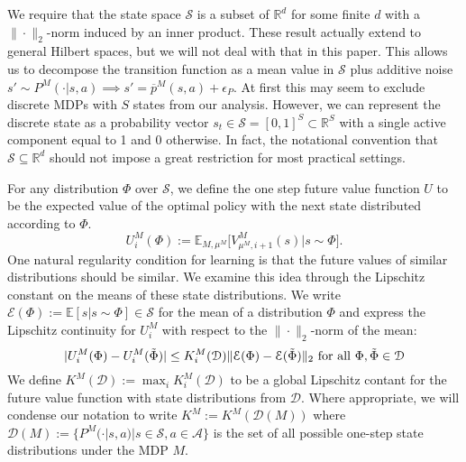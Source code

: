 \documentclass{article}
\newcommand{\Exp}{\mathds{E}}
\newcommand{\Real}{\mathds{R}}
\newcommand{\Sc}{\mathcal{S}}
\newcommand{\Ac}{\mathcal{A}}
\newcommand{\Ec}{\mathcal{E}}
\newcommand{\Dc}{\mathcal{D}}
\begin{document}
We require that the state space $\Sc$ is a subset of $\Real^d$ for some finite $d$ with a $\| \cdot \|_2$-norm induced by an inner product.
These result actually extend to general Hilbert spaces, but we will not deal with that in this paper.
This allows us to decompose the transition function as a mean value in $\Sc$ plus additive noise $s' \sim P^M(\cdot|s,a) \implies s' = \overline{p}^M(s,a) + \epsilon_P$.
At first this may seem to exclude discrete MDPs with $S$ states from our analysis.
However, we can represent the discrete state as a probability vector $s_t \in \Sc = [0,1]^S \subset \Real^S$ with a single active component equal to 1 and 0 otherwise.
In fact, the notational convention that $\Sc \subseteq \Real^d$ should not impose a great restriction for most practical settings.


For any distribution $\Phi$ over $\Sc$, we define the one step future value function $U$ to be the expected value of the optimal policy with the next state distributed according to $\Phi$.
\begin{equation}
\label{eq: future value}
U^M_{i}(\Phi) := \Exp_{M,\mu^M}\big[ V^M_{\mu^M,i+1}(s) \big| s \sim \Phi \big].
\end{equation}
One natural regularity condition for learning is that the future values of similar distributions should be similar.
We examine this idea through the Lipschitz constant on the means of these state distributions.
We write $\Ec(\Phi) := \Exp[s | s \sim \Phi] \in \Sc$ for the mean of a distribution $\Phi$ and express the Lipschitz continuity for $U_i^M$ with respect to the $\|\cdot\|_2$-norm of the mean:
\begin{equation}
\label{eq: future Lipschitz}
| U^M_i(\Phi) - U^M_i(\tilde{\Phi}) | \le K^M_i(\Dc) \| \Ec(\Phi) - \Ec(\tilde{\Phi}) \|_2 {\rm \ for \ all \ } \Phi, \tilde{\Phi} \in \Dc
\end{equation}
We define $K^M(\Dc) := \max_{i} K^M_i(\Dc)$ to be a global Lipschitz contant for the future value function with state distributions from $\Dc$.
Where appropriate, we will condense our notation to write $K^M := K^M(\mathscr{D}(M))$ where $\mathscr{D}(M) := \{P^M(\cdot |s,a) | s \in \Sc, a \in \Ac \}$ is the set of all possible one-step state distributions under the MDP $M$.
\end{document}
